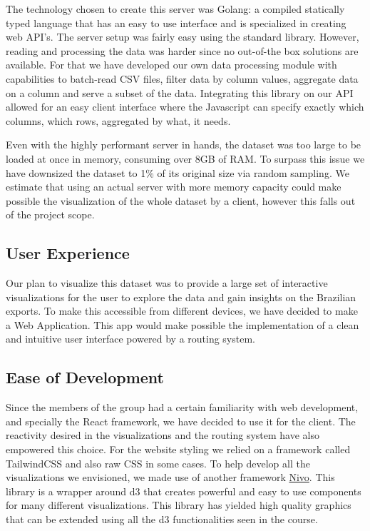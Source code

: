 \documentclass[12pt,a4]{article}
\begin{document}
The technology chosen to create this server was Golang: a compiled statically typed language that has an easy to use interface and is specialized in creating web API’s. The server setup was fairly easy using the standard library. However, reading and processing the data was harder since no out-of-the box solutions are available. For that we have developed our own data processing module with capabilities to batch-read CSV files, filter data by column values, aggregate data on a column and serve a subset of the data. Integrating this library on our API allowed for an easy client interface where the Javascript can specify exactly which columns, which rows, aggregated by what, it needs. 

Even with the highly performant server in hands, the dataset was too large to be loaded at once in memory, consuming over 8GB of RAM. To surpass this issue we have downsized the dataset to 1\% of its original size via random sampling. We estimate that using an actual server with more memory capacity could make possible the visualization of the whole dataset by a client, however this falls out of the project scope. 

\subsection{User Experience}
Our plan to visualize this dataset was to provide a large set of interactive visualizations for the user to explore the data and gain insights on the Brazilian exports. To make this accessible from different devices, we have decided to make a Web Application. This app would make possible the implementation of a clean and intuitive user interface powered by a routing system.

\subsection{Ease of Development}
Since the members of the group had a certain familiarity with web development, and specially the React framework, we have decided to use it for the client. The reactivity desired in the visualizations and the routing system have also empowered this choice. For the website styling we relied on a framework called TailwindCSS and also raw CSS in some cases. To help develop all the visualizations we envisioned, we made use of another framework \href{https://nivo.rocks/}{Nivo}. This library is a wrapper around d3 that creates powerful and easy to use components for many different visualizations. This library has yielded high quality graphics that can be extended using all the d3 functionalities seen in the course.
\end{document}
